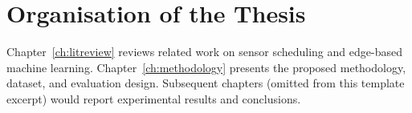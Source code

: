 \section{Organisation of the Thesis}

Chapter~\ref{ch:litreview} reviews related work on sensor scheduling and edge-based machine
learning. Chapter~\ref{ch:methodology} presents the proposed methodology, dataset, and evaluation
design. Subsequent chapters (omitted from this template excerpt) would report experimental results
and conclusions.
